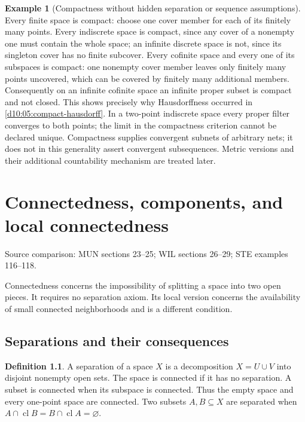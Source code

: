 \documentclass[11pt,oneside,openany]{book}
\theoremstyle{definition}
\newtheorem{definition}[theorem]{Definition}
\newtheorem{example}[theorem]{Example}
\theoremstyle{remark}
\DeclareMathOperator{\cl}{cl}
\newcommand{\source}[1]{\par\begingroup\small\sffamily\color{black!65}Source comparison: #1\par\endgroup}
\begin{document}
\begin{example}[Compactness without hidden separation or sequence assumptions]\label{d10:05:cautions}
Every finite space is compact: choose one cover member for each of its finitely many points. Every indiscrete space is compact, since any cover of a nonempty one must contain the whole space; an infinite discrete space is not, since its singleton cover has no finite subcover. Every cofinite space and every one of its subspaces is compact: one nonempty cover member leaves only finitely many points uncovered, which can be covered by finitely many additional members. Consequently on an infinite cofinite space an infinite proper subset is compact and not closed. This shows precisely why Hausdorffness occurred in \cref{d10:05:compact-hausdorff}. In a two-point indiscrete space every proper filter converges to both points; the limit in the compactness criterion cannot be declared unique. Compactness supplies convergent subnets of arbitrary nets; it does not in this generality assert convergent subsequences. Metric versions and their additional countability mechanism are treated later.
\end{example}



\chapter{Connectedness, components, and local connectedness}\label{ch:d10-06}
\source{MUN sections 23--25; WIL sections 26--29; STE examples 116--118.}

Connectedness concerns the impossibility of splitting a space into two open pieces. It requires no separation axiom. Its local version concerns the availability of small connected neighborhoods and is a different condition.

\section{Separations and their consequences}
\begin{definition}\label{d10:06:connected}
A separation of a space $X$ is a decomposition $X=U\cup V$ into disjoint nonempty open sets. The space is connected if it has no separation. A subset is connected when its subspace is connected. Thus the empty space and every one-point space are connected. Two subsets $A,B\subseteq X$ are separated when $A\cap\cl B=B\cap\cl A=\varnothing$.
\end{definition}
\end{document}

